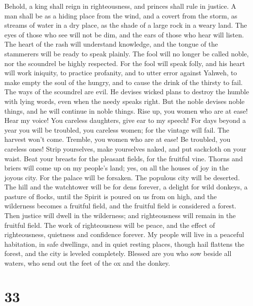  Behold, a king shall reign in righteousness, and princes
shall rule in justice.  A man shall be as a hiding place
from the wind, and a covert from the storm, as streams of water in a dry
place, as the shade of a large rock in a weary land.  The
eyes of those who see will not be dim, and the ears of those who hear
will listen.  The heart of the rash will understand
knowledge, and the tongue of the stammerers will be ready to speak
plainly.  The fool will no longer be called noble, nor the
scoundrel be highly respected.  For the fool will speak
folly, and his heart will work iniquity, to practice profanity, and to
utter error against Yahweh, to make empty the soul of the hungry, and to
cause the drink of the thirsty to fail.  The ways of the
scoundrel are evil. He devises wicked plans to destroy the humble with
lying words, even when the needy speaks right.  But the
noble devises noble things, and he will continue in noble things.
 Rise up, you women who are at ease! Hear my voice! You
careless daughters, give ear to my speech!  For days
beyond a year you will be troubled, you careless women; for the vintage
will fail. The harvest won't come.  Tremble, you women
who are at ease! Be troubled, you careless ones! Strip yourselves, make
yourselves naked, and put sackcloth on your waist.  Beat
your breasts for the pleasant fields, for the fruitful vine.
 Thorns and briers will come up on my people's land; yes,
on all the houses of joy in the joyous city.  For the
palace will be forsaken. The populous city will be deserted. The hill
and the watchtower will be for dens forever, a delight for wild donkeys,
a pasture of flocks,  until the Spirit is poured on us
from on high, and the wilderness becomes a fruitful field, and the
fruitful field is considered a forest.  Then justice will
dwell in the wilderness; and righteousness will remain in the fruitful
field.  The work of righteousness will be peace, and the
effect of righteousness, quietness and confidence forever.
 My people will live in a peaceful habitation, in safe
dwellings, and in quiet resting places,  though hail
flattens the forest, and the city is leveled completely. 
Blessed are you who sow beside all waters, who send out the feet of the
ox and the donkey.

\hypertarget{section-32}{%
\section{33}\label{section-32}}

